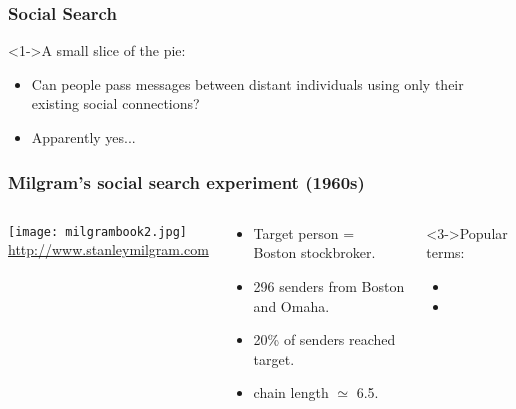\begin{frame}
  \frametitle{Social Search}

  \begin{block}<1->{A small slice of the pie:}
    \begin{itemize}
    \item<1-> 
       Can people pass messages between distant individuals 
      using only their existing social connections?
    \item<2->
       Apparently yes...
    \end{itemize}
  \end{block}


\end{frame}



\begin{frame}
  \frametitle{Milgram's social search experiment (1960s)}

  \begin{columns}
    \texttt{[image: milgrambook2.jpg]}\\
    \tiny{\url{http://www.stanleymilgram.com}}

    \begin{block}{}
      \begin{itemize}
      \item Target person = \\ Boston stockbroker.
      \item 296 senders from Boston and Omaha.
      \item<2-> 20\% of senders reached target.
      \item<2-> chain length $\simeq$ 6.5.
      \end{itemize}
    \end{block}

     \begin{block}<3->{Popular terms:}
       \begin{itemize}
       \item<3-> 
       \item<3->
       \end{itemize}
     \end{block}

  \end{columns}

\end{frame}

